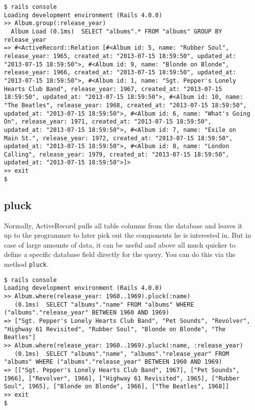 \documentclass[a4paper]{book}
\newcounter{tab}[chapter]
\begin{document}
\begin{shaded}\begin{verbatim}
$ rails console
Loading development environment (Rails 4.0.0)
>> Album.group(:release_year)
  Album Load (0.1ms)  SELECT "albums".* FROM "albums" GROUP BY release_year
=> #<ActiveRecord::Relation [#<Album id: 5, name: "Rubber Soul", release_year: 1965, created_at: "2013-07-15 18:59:50", updated_at: "2013-07-15 18:59:50">, #<Album id: 9, name: "Blonde on Blonde", release_year: 1966, created_at: "2013-07-15 18:59:50", updated_at: "2013-07-15 18:59:50">, #<Album id: 1, name: "Sgt. Pepper's Lonely Hearts Club Band", release_year: 1967, created_at: "2013-07-15 18:59:50", updated_at: "2013-07-15 18:59:50">, #<Album id: 10, name: "The Beatles", release_year: 1968, created_at: "2013-07-15 18:59:50", updated_at: "2013-07-15 18:59:50">, #<Album id: 6, name: "What's Going On", release_year: 1971, created_at: "2013-07-15 18:59:50", updated_at: "2013-07-15 18:59:50">, #<Album id: 7, name: "Exile on Main St.", release_year: 1972, created_at: "2013-07-15 18:59:50", updated_at: "2013-07-15 18:59:50">, #<Album id: 8, name: "London Calling", release_year: 1979, created_at: "2013-07-15 18:59:50", updated_at: "2013-07-15 18:59:50">]>
>> exit
$
\end{verbatim}\end{shaded}

\subsection{pluck}\label{pluck}

Normally, ActiveRecord pulls all table columns from the database and leaves it up to the programmer to later pick out the components he is interested in. But in case of large amounts of data, it can be useful and above all much quicker to define a specific database field directly for the query. You can do this via the method \texttt{pluck}.

\begin{shaded}\begin{verbatim}
$ rails console
Loading development environment (Rails 4.0.0)
>> Album.where(release_year: 1960..1969).pluck(:name)
   (0.1ms)  SELECT "albums"."name" FROM "albums" WHERE ("albums"."release_year" BETWEEN 1960 AND 1969)
=> ["Sgt. Pepper's Lonely Hearts Club Band", "Pet Sounds", "Revolver", "Highway 61 Revisited", "Rubber Soul", "Blonde on Blonde", "The Beatles"]
>> Album.where(release_year: 1960..1969).pluck(:name, :release_year)
   (0.1ms)  SELECT "albums"."name", "albums"."release_year" FROM "albums" WHERE ("albums"."release_year" BETWEEN 1960 AND 1969)
=> [["Sgt. Pepper's Lonely Hearts Club Band", 1967], ["Pet Sounds", 1966], ["Revolver", 1966], ["Highway 61 Revisited", 1965], ["Rubber Soul", 1965], ["Blonde on Blonde", 1966], ["The Beatles", 1968]]
>> exit
$
\end{verbatim}\end{shaded}
\end{document}
